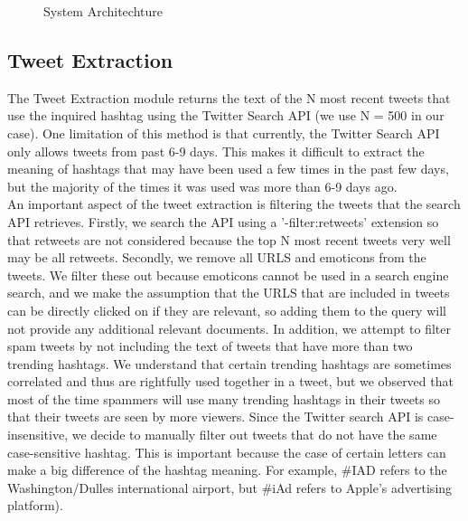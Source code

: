 \documentclass{sig-alternate}
\begin{document}
\begin{figure}[h!]
   \caption{System Architechture} \label{fig:SystemArchitechture}
\end{figure}


\subsection{Tweet Extraction}
The Tweet Extraction module returns the text of the N most recent tweets that use the inquired hashtag using the Twitter Search API (we use N = 500 in our case). One limitation of this method is that currently, the Twitter Search API  only allows tweets from past 6-9 days. This makes it difficult to extract the meaning of hashtags that may have been used a few times in the past few days, but the majority of the times it was used was more than 6-9 days ago. \\
An important aspect of the tweet extraction is filtering the tweets that the search API retrieves. Firstly, we search the API using a '-filter:retweets' extension so that retweets are not considered because the top N most recent tweets very well may be all retweets. Secondly, we remove all URLS and emoticons from the tweets. We filter these out because emoticons cannot be used in a search engine search, and we make the assumption that the URLS that are included in tweets can be directly clicked on if they are relevant, so adding them to the query will not provide any additional relevant documents. In addition, we attempt to filter spam tweets by not including the text of tweets that have more than two trending hashtags. We understand that certain trending hashtags are sometimes correlated and thus are rightfully used together in a tweet, but we observed that most of the time spammers will use many trending hashtags in their tweets so that their tweets are seen by more viewers.
Since the Twitter search API is case-insensitive, we decide to manually filter out tweets that do not have the same case-sensitive hashtag. This is important because the case of certain letters can make a big difference of the hashtag meaning. For example, \#IAD refers to the Washington/Dulles international airport, but \#iAd refers to Apple's advertising platform). \\
\end{document}
